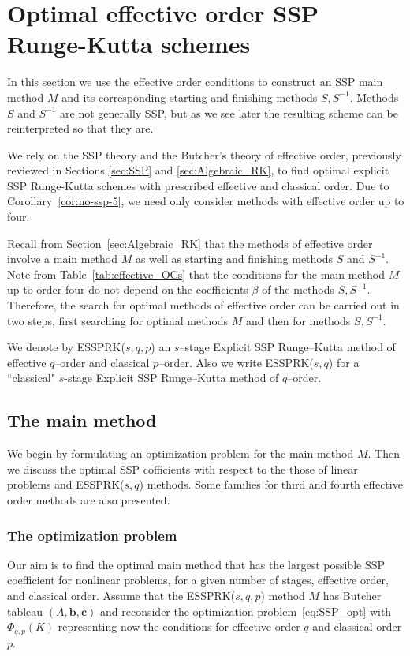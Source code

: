 \section{Optimal effective order SSP Runge-Kutta schemes}\label{sec:optimal_ESSPRK}
In this section we use the effective order conditions to construct an SSP main method $M$ and 
its corresponding starting and finishing methods $S, S^{-1}$. 
Methods $S$ and $S^{-1}$ are not generally SSP, but as we see later the resulting scheme can 
be reinterpreted so that they are.

We rely on the SSP theory and the Butcher's theory of effective order, previously reviewed in 
Sections \ref{sec:SSP} and \ref{sec:Algebraic_RK}, to find optimal explicit SSP Runge-Kutta 
schemes with prescribed effective and classical order. 
Due to Corollary~\ref{cor:no-ssp-5}, we need only consider methods with effective order up 
to four.

Recall from Section~\ref{sec:Algebraic_RK} that the methods of effective order involve a main 
method $M$ as well as starting and finishing methods $S$ and $S^{-1}$.
Note from Table~\ref{tab:effective_OCs} that the conditions for the main method $M$ up to 
order four do not depend on the coefficients $\beta$ of the methods $S, S^{-1}$. 
Therefore, the search for optimal methods of effective order can be carried out in two steps, 
first searching for optimal methods $M$ and then for methods $S, S^{-1}$.

We denote by ESSPRK($s,q,p$) an $s$--stage Explicit SSP Runge--Kutta method of effective 
$q$--order and classical $p$--order. 
Also we write ESSPRK($s,q$) for a ``classical" $s$-stage Explicit SSP Runge--Kutta method of 
$q$--order.

\subsection{The main method}\label{subsec:main_method}
We begin by formulating an optimization problem for the main method $M$. 
Then we discuss the optimal SSP cofficients with respect to the those of linear problems and 
ESSPRK($s,q$) methods. Some families for third and fourth effective order methods are also 
presented.

\subsubsection{The optimization problem}\label{subsubsec:opt_problem}
Our aim is to find the optimal main method that has the largest possible SSP coefficient for 
nonlinear problems, for a given number of stages, effective order, and classical order. 
Assume that the ESSPRK($s,q,p$) method $M$ has Butcher tableau
$(A, \bm{b}, \bm{c})$ and 
reconsider the optimization problem~\eqref{eq:SSP_opt} with $\Phi_{q,p}(K)$ representing 
now the conditions for effective order $q$ and classical order $p$.

